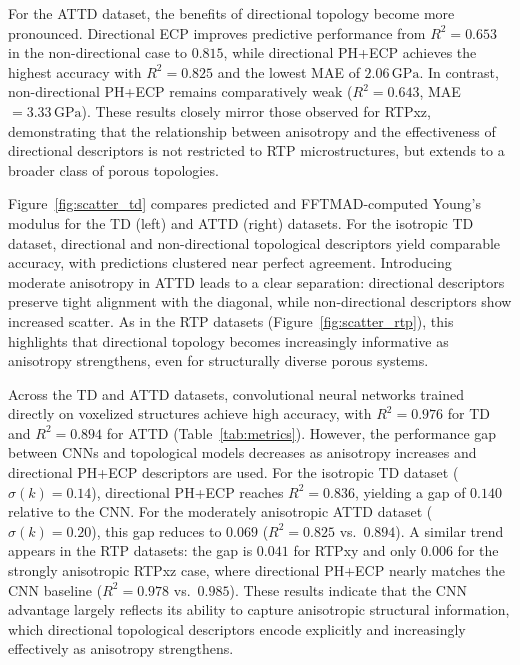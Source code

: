 \documentclass[sn-mathphys,Numbered]{sn-jnl}
\theoremstyle{definition}
\begin{document}
For the ATTD dataset, the benefits of directional topology become
more pronounced. Directional ECP improves predictive performance from $R^2=0.653$ in the
non-directional case to $0.815$, while directional PH+ECP achieves the highest
accuracy with $R^2=0.825$ and the lowest MAE of $2.06\,\mathrm{GPa}$.
In contrast, non-directional PH+ECP remains comparatively weak
($R^2=0.643$, MAE $=3.33\,\mathrm{GPa}$).
These results closely mirror those observed for RTPxz, demonstrating that the
relationship between anisotropy and the effectiveness of directional
descriptors is not restricted to RTP microstructures, but extends to a broader
class of porous topologies.

Figure~\ref{fig:scatter_td} compares predicted and FFTMAD-computed Young’s modulus for the TD (left) and ATTD (right) datasets. For the isotropic TD dataset, directional and non-directional topological descriptors yield comparable accuracy, with predictions clustered near perfect agreement. Introducing moderate anisotropy in ATTD leads to a clear separation: directional descriptors preserve tight alignment with the diagonal, while non-directional descriptors show increased scatter. As in the RTP datasets (Figure~\ref{fig:scatter_rtp}), this highlights that directional topology becomes increasingly informative as anisotropy strengthens, even for structurally diverse porous systems.


Across the TD and ATTD datasets, convolutional neural networks trained directly on voxelized structures achieve high accuracy, with $R^2 = 0.976$ for TD and $R^2 = 0.894$ for ATTD (Table~\ref{tab:metrics}). However, the performance gap between CNNs and topological models decreases as anisotropy increases and directional PH+ECP descriptors are used.
For the isotropic TD dataset ($\sigma(k)=0.14$), directional PH+ECP reaches $R^2 = 0.836$, yielding a gap of $0.140$ relative to the CNN. For the moderately anisotropic ATTD dataset ($\sigma(k)=0.20$), this gap reduces to $0.069$ ($R^2 = 0.825$ vs.\ $0.894$). A similar trend appears in the RTP datasets: the gap is $0.041$ for RTPxy and only $0.006$ for the strongly anisotropic RTPxz case, where directional PH+ECP nearly matches the CNN baseline ($R^2 = 0.978$ vs.\ $0.985$).
These results indicate that the CNN advantage largely reflects its ability to capture anisotropic structural information, which directional topological descriptors encode explicitly and increasingly effectively as anisotropy strengthens.
\end{document}
